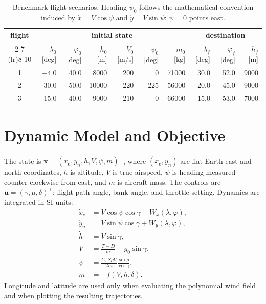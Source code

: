 \documentclass[11pt,a4paper]{article}
\begin{document}
\begin{table}[h]
\centering
\caption{Benchmark flight scenarios. Heading $\psi_0$ follows the
mathematical convention induced by $\dot{x}=V\cos\psi$ and
$\dot{y}=V\sin\psi$: $\psi=0$ points east.}
\label{tab:flights}
\small
\begin{tabular}{c rr rrr r rr r}
\toprule
\multirow{2}{*}{flight}
 & \multicolumn{6}{c}{initial state} & \multicolumn{3}{c}{destination} \\
\cmidrule(lr){2-7} \cmidrule(lr){8-10}
 & $\lambda_0$ [deg] & $\varphi_0$ [deg] & $h_0$ [m] & $V_0$ [m/s]
 & $\psi_0$ [deg] & $m_0$ [kg]
 & $\lambda_f$ [deg] & $\varphi_f$ [deg] & $h_f$ [m] \\
\midrule
1 & $-4.0$ & 40.0 & 8000  & 200 &   0 & 71000 & 30.0 & 52.0 & 9000 \\
2 & 30.0   & 50.0 & 10000 & 220 & 225 & 56000 & 20.0 & 45.0 & 9000 \\
3 & 15.0   & 40.0 & 9000  & 210 &   0 & 66000 & 15.0 & 53.0 & 7000 \\
\bottomrule
\end{tabular}
\end{table}

\section{Dynamic Model and Objective}
The state is
$\mathbf{x}=(x_e,y_n,h,V,\psi,m)^\top$, where $(x_e,y_n)$ are
flat-Earth east and north coordinates, $h$ is altitude, $V$ is true
airspeed, $\psi$ is heading measured counter-clockwise from east, and
$m$ is aircraft mass. The controls are
$\mathbf{u}=(\gamma,\mu,\delta)^\top$: flight-path angle, bank angle,
and throttle setting. Dynamics are integrated in SI units:
\begin{equation}
\begin{aligned}
\dot{x}_e &= V\cos\psi\cos\gamma + W_x(\lambda,\varphi),\\
\dot{y}_n &= V\sin\psi\cos\gamma + W_y(\lambda,\varphi),\\
\dot{h}   &= V\sin\gamma,\\
\dot{V}   &= \frac{T-D}{m} - g_0\sin\gamma,\\
\dot{\psi}&= \frac{C_L S\rho V}{2m}\frac{\sin\mu}{\cos\gamma},\\
\dot{m}   &= -f(V,h,\delta).
\end{aligned}
\label{eq:dyn}
\end{equation}
Longitude and latitude are used only when evaluating the polynomial wind
field and when plotting the resulting trajectories.
\end{document}
